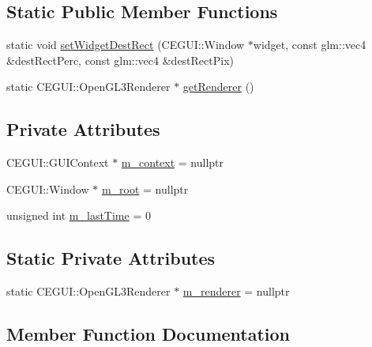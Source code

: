 \subsection*{Static Public Member Functions}
\begin{DoxyCompactItemize}
\item 
static void \hyperlink{class_otherwise_1_1_g_u_i_a63bdb668c0d04ae7c93159dce9469d32}{set\+Widget\+Dest\+Rect} (C\+E\+G\+U\+I\+::\+Window $\ast$widget, const glm\+::vec4 \&dest\+Rect\+Perc, const glm\+::vec4 \&dest\+Rect\+Pix)
\item 
static C\+E\+G\+U\+I\+::\+Open\+G\+L3\+Renderer $\ast$ \hyperlink{class_otherwise_1_1_g_u_i_a0f7980dfb3eb65fe8be201bee814aa19}{get\+Renderer} ()
\end{DoxyCompactItemize}
\subsection*{Private Attributes}
\begin{DoxyCompactItemize}
\item 
C\+E\+G\+U\+I\+::\+G\+U\+I\+Context $\ast$ \hyperlink{class_otherwise_1_1_g_u_i_a6d6c577375d688bf2a92ee514d76e2de}{m\+\_\+context} = nullptr
\item 
C\+E\+G\+U\+I\+::\+Window $\ast$ \hyperlink{class_otherwise_1_1_g_u_i_a913d15fe9ed784b2291d6b4c642e09a2}{m\+\_\+root} = nullptr
\item 
unsigned int \hyperlink{class_otherwise_1_1_g_u_i_a2ca71b9f19ec83ea95a0401bb020a895}{m\+\_\+last\+Time} = 0
\end{DoxyCompactItemize}
\subsection*{Static Private Attributes}
\begin{DoxyCompactItemize}
\item 
static C\+E\+G\+U\+I\+::\+Open\+G\+L3\+Renderer $\ast$ \hyperlink{class_otherwise_1_1_g_u_i_ac8ab7faa598219a9134e2841f142afbd}{m\+\_\+renderer} = nullptr
\end{DoxyCompactItemize}


\subsection{Member Function Documentation}
\mbox{\label{class_otherwise_1_1_g_u_i_a210f438c6c5c52c34c8f2d5397cbab60}} 
